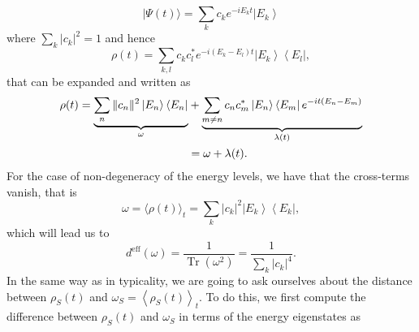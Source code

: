 \begin{equation}
|\Psi(t)\rangle=\sum_{k} c_{k} e^{-i E_{k} t}\left|E_{k}\right\rangle
\label{CH1:expansion_1}
\end{equation}
where $\sum_{k}\left|c_{k}\right|^{2}=1$ and hence
\begin{equation}
\rho(t)=\sum_{k, l} c_{k} c_{l}^{*} e^{-i\left(E_{k}-E_{l}\right) t}\left|E_{k}\right\rangle\left\langle E_{l}\right|,
\label{CH1:expansion_2}
\end{equation}
that can be expanded and written as
\begin{equation}
\begin{aligned}
\rho(t)=\underbrace{\sum_{n}\|c_{n}\|^{2}\mathinner{|{E_{n}}\rangle}\mathinner{\langle{E_{n}}|}}_{\omega}&+\underbrace{\sum_{m \neq n} c_{n} c_{m}^{*}\mathinner{|{E_{n}}\rangle}\mathinner{\langle{E_{m}}|} e^{-i t\left(E_{n}-E_{m}\right)}}_{\lambda (t)} \\
&=\omega+\lambda(t).
\end{aligned}
\label{CH1:Expansion_to_use_after}
\end{equation}
For the case of non-degeneracy of the energy levels, we have that the cross-terms vanish, that is
\begin{equation}
\omega=\langle\rho(t)\rangle_{t}=\sum_{k}\left|c_{k}\right|^{2}\left|E_{k}\right\rangle\left\langle E_{k}\right|,
\label{CH1:expansion_3}
\end{equation}
which will lead us to 
\begin{equation}
d^{\mathrm{eff}}(\omega)=\frac{1}{\operatorname{Tr}\left(\omega^{2}\right)}=\frac{1}{\sum_{k}\left|c_{k}\right|^{4}}.
\label{CH1:expansion_4}
\end{equation}
In the same way as in typicality, we are going to ask ourselves about the distance between $\rho_{S}(t)$ and $\omega_{S}=\left\langle\rho_{S}(t)\right\rangle_{t}$. To do this, we first compute the difference between $\rho_S(t)$ and $\omega_{S}$ in terms of the energy eigenstates as
